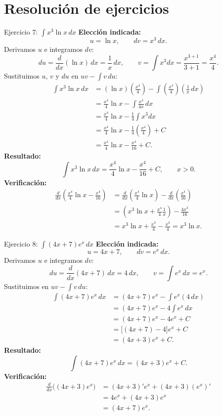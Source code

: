 \section{Resolución de ejercicios}

\begin{examplebox}{Ejercicio 7: $\int x^3\ln x\,dx$}
\textbf{Elección indicada:}
\[
 u=\ln x,\qquad dv=x^3\,dx.
\]
Derivamos $u$ e integramos $dv$:
\[
 du=\frac{d}{dx}(\ln x)\,dx=\frac{1}{x}\,dx,
 \qquad
 v=\int x^3dx=\frac{x^{3+1}}{3+1}=\frac{x^4}{4}.
\]
Sustituimos $u$, $v$ y $du$ en $uv-\int v\,du$:
\begin{align*}
 \int x^3\ln x\,dx
 &=(\ln x)\left(\frac{x^4}{4}\right)
   -\int\left(\frac{x^4}{4}\right)\left(\frac{1}{x}\,dx\right)\\
 &=\frac{x^4}{4}\ln x-\int\frac{x^4}{4x}\,dx\\
 &=\frac{x^4}{4}\ln x-\frac14\int x^3dx\\
 &=\frac{x^4}{4}\ln x-\frac14\left(\frac{x^4}{4}\right)+C\\
 &=\frac{x^4}{4}\ln x-\frac{x^4}{16}+C.
\end{align*}
\textbf{Resultado:}
\[
 \boxed{\int x^3\ln x\,dx=\frac{x^4}{4}\ln x-\frac{x^4}{16}+C},\qquad x>0.
\]
\textbf{Verificación:}
\begin{align*}
 \frac{d}{dx}\left(\frac{x^4}{4}\ln x-\frac{x^4}{16}\right)
 &=\frac{d}{dx}\left(\frac{x^4}{4}\ln x\right)
   -\frac{d}{dx}\left(\frac{x^4}{16}\right)\\
 &=\left(x^3\ln x+\frac{x^4}{4}\frac1x\right)-\frac{4x^3}{16}\\
 &=x^3\ln x+\frac{x^3}{4}-\frac{x^3}{4}=x^3\ln x.
\end{align*}
\end{examplebox}

\begin{examplebox}{Ejercicio 8: $\int(4x+7)e^x\,dx$}
\textbf{Elección indicada:}
\[
 u=4x+7,\qquad dv=e^x\,dx.
\]
Derivamos $u$ e integramos $dv$:
\[
 du=\frac{d}{dx}(4x+7)\,dx=4\,dx,
 \qquad v=\int e^x\,dx=e^x.
\]
Sustituimos en $uv-\int v\,du$:
\begin{align*}
 \int(4x+7)e^x\,dx
 &=(4x+7)e^x-\int e^x(4\,dx)\\
 &=(4x+7)e^x-4\int e^x\,dx\\
 &=(4x+7)e^x-4e^x+C\\
 &=\bigl[(4x+7)-4\bigr]e^x+C\\
 &=(4x+3)e^x+C.
\end{align*}
\textbf{Resultado:}
\[
 \boxed{\int(4x+7)e^x\,dx=(4x+3)e^x+C}.
\]
\textbf{Verificación:}
\begin{align*}
 \frac{d}{dx}\bigl((4x+3)e^x\bigr)
 &=(4x+3)'e^x+(4x+3)(e^x)'\\
 &=4e^x+(4x+3)e^x\\
 &=(4x+7)e^x.
\end{align*}
\end{examplebox}

